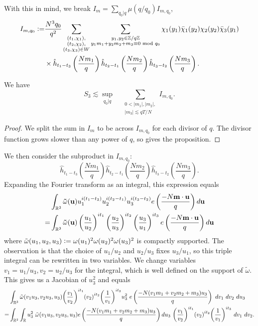 With this in mind, we break $I_m=\sum_{q_0|q}\mu(q/q_0)I_{m,q_0}$,\begin{align*}
I_{m,q_0}\mathrel{\mathop:}=&\frac{N^3q_0}{q^2}\sum_{\substack{(t_1,\chi_1),\\(t_2,\chi_2),\\(t_3,\chi_3)\in W}} \sum_{\substack{y_1,y_2 \in\mathbb{Z}/q\mathbb{Z} \\ y_1m_1+y_2m_2+m_3\equiv 0 \textrm{ mod } q_0}}\chi_1(y_1)\bar{\chi}_1(y_2)\chi_2(y_2)\bar{\chi}_3(y_1)\\
&\times \hat{h}_{t_1-t_3}\left(\frac{Nm_1}{q}\right)\hat{h}_{t_2-t_1}\left(\frac{Nm_2}{q}\right)\hat{h}_{t_3-t_2}\left(\frac{Nm_3}{q}\right).
\end{align*}
\begin{proposition}  \label{divisorreduction}We have\[
    S_3 \lesssim \sup_{q_0|q}\quad \sum_{\substack{0<|m_1|,|m_2|,\\|m_3|\lesssim qT/N}} I_{m,q_0}.
    \]
\end{proposition}
\begin{proof}
    We split the sum in $I_m$ to be across $I_{m,q_0}$ for each divisor of $q$. The divisor function grows slower than any power of $q$, so gives the proposition.
\end{proof}
We then consider the subproduct in $I_{m,q_0}$: \[
	\hat{h}_{t_1-t_3}\left(\frac{Nm_1}{q}\right)\hat{h}_{t_2-t_1}\left(\frac{Nm_2}{q}\right)\hat{h}_{t_3-t_2}\left(\frac{Nm_3}{q}\right).
\]
Expanding the Fourier transform as an integral, this expression equals \begin{align*}
	 &\int_{\mathbb{R}^3}\mathbf{\tilde{\omega}}(\mathbf{u})u_1^{i(t_1-t_3)}u_2^{i(t_2-t_1)}u_3^{i(t_3-t_2)}e\left(\frac{-N\mathbf{m}\cdot \mathbf{u}}{q}\right)d\mathbf{u}\\
	 =&\int_{\mathbb{R}^3}\mathbf{\tilde{\omega}}(\mathbf{u})\left(\frac{u_1}{u_2}\right)^{it_1}\left(\frac{u_2}{u_3}\right)^{it_2}\left(\frac{u_3}{u_1}\right)^{it_3}
	 e\left(\frac{-N\mathbf{m}\cdot \mathbf{u}}{q}\right)d\mathbf{u}
	 \end{align*}
	 where $\tilde{\omega}(u_1,u_2,u_3)\mathrel{\mathop:}= \omega(u_1)^2\omega(u_2)^2\omega(u_3)^2$ is compactly supported. The observation is that the choice of $u_1/u_2$ and $u_2/u_3$ fixes $u_3/u_1$, so this triple integral can be rewritten in two variables. We change variables $v_1=u_1/u_3,v_2=u_2/u_3$ for the integral, which is well defined on the support of $\tilde{\omega}$. This gives us a Jacobian of $u_3^2$ and equals
	 \begin{equation}\label{im1integral}
        \begin{split}
	&\int_{\reals^3}\tilde{\omega}(v_1u_3,v_2u_3,u_3) {\left(\frac{v_1}{v_2}\right)}^{it_1} {\left(v_2\right)}^{it_2}{\left(\frac{1}{v_1}\right)}^{it_3} u_3^2 \ e\left(\frac{-N(v_1m_1+v_2m_2+m_3)u_3}{q}\right)\ dv_1\ dv_2\ du_3\\
	=&\int_{\reals^2}\int_\reals u_3^2 \ \tilde{\omega}(v_1u_3,v_2u_3,u_3) e\left(\frac{-N(v_1m_1+v_2m_2+m_3)u_3}{q}\right)  du_3 \ {\left(\frac{v_1}{v_2}\right)}^{it_1} {\left(v_2\right)}^{it_2}{\left(\frac{1}{v_1}\right)}^{it_3}  \ dv_1\ dv_2.\\
     \end{split}
\end{equation}
